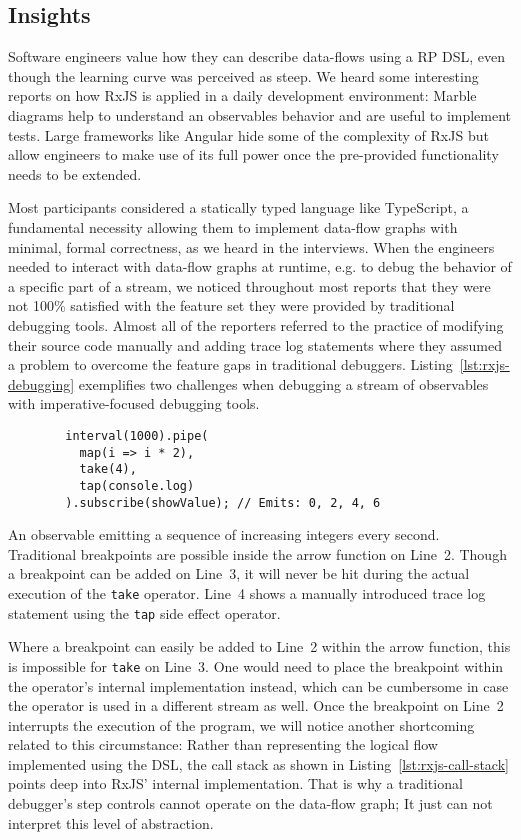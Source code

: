 \documentclass[sigplan,screen,review]{acmart}
\begin{document}
\subsection{Insights}

Software engineers value how they can describe data-flows using a RP DSL, even though the learning curve was perceived as steep. We heard some interesting reports on how RxJS is applied in a daily development environment: Marble diagrams help to understand  an observables behavior and are useful to implement tests. Large frameworks like Angular hide some of the complexity of RxJS but allow engineers to make use of its full power once the pre-provided functionality needs to be extended.

Most participants considered a statically typed language like TypeScript, a fundamental necessity allowing them to implement data-flow graphs with minimal, formal correctness, as we heard in the interviews. When the engineers needed to interact with data-flow graphs at runtime, e.g. to debug the behavior of a specific part of a stream, we noticed throughout most reports that they were not 100\% satisfied with the feature set they were provided by traditional debugging tools. Almost all of the reporters referred to the practice of modifying their source code manually and adding trace log statements where they assumed a problem to overcome the feature gaps in traditional debuggers. Listing~\ref{lst:rxjs-debugging} exemplifies two challenges when debugging a stream of observables with imperative-focused debugging tools.

\begin{listing}
	\begin{verbatim}
		interval(1000).pipe(
		  map(i => i * 2),
		  take(4),
		  tap(console.log)
		).subscribe(showValue); // Emits: 0, 2, 4, 6
	\end{verbatim}
	\caption{An observable emitting a sequence of increasing integers every second. Traditional breakpoints are possible inside the arrow function on Line~2. Though a breakpoint can be added on Line~3, it will never be hit during the actual execution of the \texttt{take} operator. Line~4 shows a manually introduced trace log statement using the \texttt{tap} side effect operator.}
	\label{lst:rxjs-debugging}
\end{listing}

Where a breakpoint can easily be added to Line~2 within the arrow function, this is impossible for \texttt{take} on Line~3. One would need to place the breakpoint within the operator's internal implementation instead, which can be cumbersome in case the operator is used in a different stream as well. Once the breakpoint on Line~2 interrupts the execution of the program, we will notice another shortcoming related to this circumstance: Rather than representing the logical flow implemented using the DSL, the call stack as shown in Listing~\ref{lst:rxjs-call-stack} points deep into RxJS' internal implementation. That is why a traditional debugger's step controls cannot operate on the data-flow graph; It just can not interpret this level of abstraction.
\end{document}
